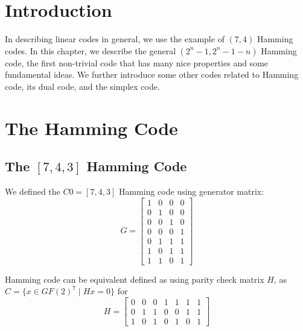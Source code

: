 
\Contributor{}

\lstset{style=mystyle}

	\MakeScribeTop

\section{Introduction}
In describing linear codes in general, we use the example of \((7,4)\) Hamming codes. In this chapter, we describe the general \((2^n-1, 2^n-1-n)\) Hamming code, the first non-trivial code that has many nice properties and some fundamental ideas. We further introduce some other codes related to Hamming code, its dual code, and the simplex code. 


\section{The Hamming Code }

\subsection{The \([7,4, 3]\) Hamming Code}
We defined the \(C0 = [7, 4, 3]\) Hamming code using generator matrix:
$$G = \begin{bmatrix}
    1 & 0 & 0 & 0\\
    0 & 1 & 0 & 0\\
    0 & 0 & 1 & 0\\
    0 & 0 & 0 & 1\\
    0 & 1 & 1 & 1\\
    1 & 0 & 1 & 1\\
    1 & 1 & 0 & 1
\end{bmatrix}$$

\begin{lemma}
    Hamming code can be equivalent defined as using parity check matrix \(H\), as \(C =\{ x \in GF(2)^7 \;|\; H x = 0 \}\) for 
$$H = \begin{bmatrix}
    0 & 0 & 0 & 1 & 1 & 1 & 1\\
    0 & 1 & 1 & 0 & 0 & 1 & 1\\
    1 & 0 & 1 & 0 & 1 & 0 & 1
\end{bmatrix}$$
\end{lemma}

